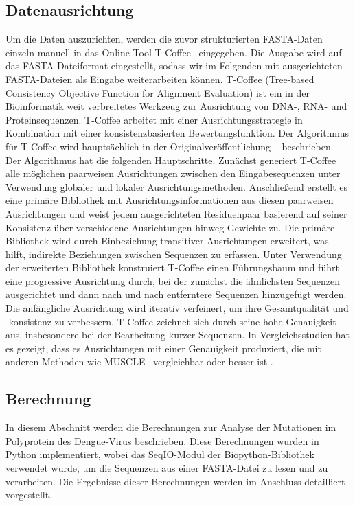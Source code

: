 \documentclass[german,version-2022-01]{uzl-thesis}
\begin{document}
\subsection{Datenausrichtung}
Um die Daten auszurichten, werden die zuvor strukturierten FASTA-Daten einzeln manuell in das Online-Tool T-Coffee~\cite{tcoffee} eingegeben. Die Ausgabe wird auf das FASTA-Dateiformat eingestellt, sodass wir im Folgenden mit ausgerichteten FASTA-Dateien als Eingabe weiterarbeiten k\"onnen. T-Coffee (Tree-based Consistency Objective Function for Alignment Evaluation) ist ein in der Bioinformatik weit verbreitetes Werkzeug zur Ausrichtung von DNA-, RNA- und Proteinsequenzen. T-Coffee arbeitet mit einer Ausrichtungsstrategie in Kombination mit einer konsistenzbasierten Bewertungsfunktion. Der Algorithmus f\"ur T-Coffee wird haupts\"achlich in der Originalver\"offentlichung ~\cite{poirot_tcoffeeigs_2003} beschrieben. Der Algorithmus hat die folgenden Hauptschritte. Zun\"achst generiert T-Coffee alle m\"oglichen paarweisen Ausrichtungen zwischen den Eingabesequenzen unter Verwendung globaler und lokaler Ausrichtungsmethoden. Anschlie\ss{}end erstellt es eine prim\"are Bibliothek mit Ausrichtungsinformationen aus diesen paarweisen Ausrichtungen und weist jedem ausgerichteten Residuenpaar basierend auf seiner Konsistenz \"uber verschiedene Ausrichtungen hinweg Gewichte zu. Die prim\"are Bibliothek wird durch Einbeziehung transitiver Ausrichtungen erweitert, was hilft, indirekte Beziehungen zwischen Sequenzen zu erfassen. Unter Verwendung der erweiterten Bibliothek konstruiert T-Coffee einen F\"uhrungsbaum und f\"uhrt eine progressive Ausrichtung durch, bei der zun\"achst die \"ahnlichsten Sequenzen ausgerichtet und dann nach und nach entferntere Sequenzen hinzugef\"ugt werden. Die anf\"angliche Ausrichtung wird iterativ verfeinert, um ihre Gesamtqualit\"at und -konsistenz zu verbessern. T-Coffee zeichnet sich durch seine hohe Genauigkeit aus, insbesondere bei der Bearbeitung kurzer Sequenzen. In Vergleichsstudien hat es gezeigt, dass es Ausrichtungen mit einer Genauigkeit produziert, die mit anderen Methoden wie MUSCLE~\cite{Edgar2004MUSCLEL} vergleichbar oder besser ist \cite{Edgar2004MUSCLEL}.

\subsection{Berechnung}
In diesem Abschnitt werden die Berechnungen zur Analyse der Mutationen im Polyprotein des Dengue-Virus beschrieben. Diese Berechnungen wurden in Python implementiert, wobei das SeqIO-Modul der Biopython-Bibliothek verwendet wurde, um die Sequenzen aus einer FASTA-Datei zu lesen und zu verarbeiten. Die Ergebnisse dieser Berechnungen werden im Anschluss detailliert vorgestellt.
\end{document}

